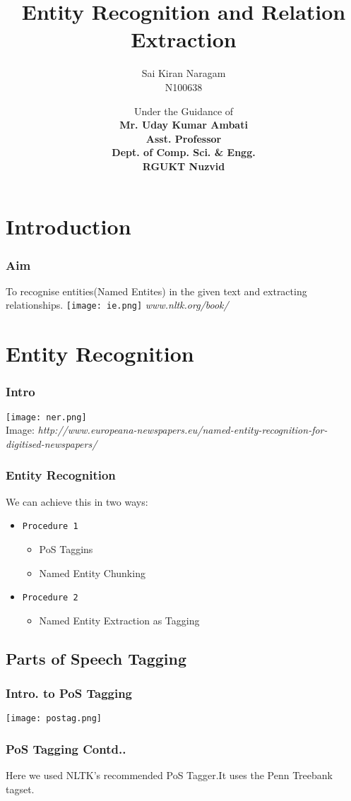 \documentclass{beamer} %
\title[ER\&RE]{Entity Recognition and Relation Extraction}
\author[Sai Kiran Naragam]{Sai Kiran Naragam\\ N100638}
\date[\today]{Under the Guidance of\\\textbf{Mr. Uday Kumar Ambati\\Asst. Professor}\\ \textbf{Dept. of Comp. Sci. \& Engg.\\RGUKT Nuzvid}}
\theoremstyle{definition} %
\begin{document}
\begin{frame} 
\titlepage
\end{frame}

\section{Introduction} %

\begin{frame} 
\frametitle{Aim}
To recognise entities(Named Entites) in the given text and extracting relationships.
\texttt{[image: ie.png]}
\textit{www.nltk.org/book/}
\end{frame}

\section[ER]{Entity Recognition}
\begin{frame}
\frametitle{Intro}
\texttt{[image: ner.png]}
\\
Image: \textit{http://www.europeana-newspapers.eu/named-entity-recognition-for-digitised-newspapers/}
\end{frame}

\begin{frame}
\frametitle{Entity Recognition}
We can achieve this in two ways:
\begin{itemize}
\pause \item \texttt{Procedure 1} %
\begin{itemize}
\item PoS Taggins
\item Named Entity Chunking
\end{itemize}
\pause \item \texttt{Procedure 2}
\begin{itemize}
\item Named Entity Extraction as Tagging
\end{itemize}
\end{itemize}
\end{frame}

\subsection[Tagging]{Parts of Speech Tagging}
\begin{frame}
\frametitle{Intro. to PoS Tagging}
\texttt{[image: postag.png]}
\end{frame}
\begin{frame}
\frametitle{PoS Tagging Contd..}
Here we used NLTK's recommended PoS Tagger.It uses the Penn Treebank tagset.
\end{frame}
\end{document}
